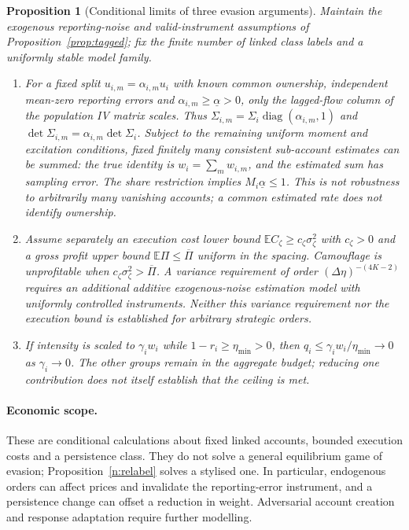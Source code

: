\documentclass[12pt]{article}
\newtheorem{proposition}[theorem]{Proposition}
\theoremstyle{definition}
\theoremstyle{remark}
\begin{document}
\begin{proposition}[Conditional limits of three evasion arguments]\label{prop:strategic}
Maintain the exogenous reporting-noise and valid-instrument assumptions of Proposition~\ref{prop:tagged}; fix the finite number of linked class labels and a uniformly stable model family.
\begin{enumerate}[label=(\roman*)]
\item For a fixed split $u_{i,m}=\alpha_{i,m}u_i$ with known common ownership, independent mean-zero reporting errors and $\alpha_{i,m}\ge\underline\alpha>0$, only the lagged-flow column of the population IV matrix scales. Thus $\Sigma_{i,m}=\Sigma_i\operatorname{diag}(\alpha_{i,m},1)$ and $\det\Sigma_{i,m}=\alpha_{i,m}\det\Sigma_i$. Subject to the remaining uniform moment and excitation conditions, fixed finitely many consistent sub-account estimates can be summed: the true identity is $w_i=\sum_m w_{i,m}$, and the estimated sum has sampling error. The share restriction implies $M_i\underline\alpha\le1$. This is not robustness to arbitrarily many vanishing accounts; a common estimated rate does not identify ownership.
\item Assume separately an execution cost lower bound $\mathbb E C_\zeta\ge c_\zeta\sigma_\zeta^2$ with $c_\zeta>0$ and a gross profit upper bound $\mathbb E\Pi\le\overline\Pi$ uniform in the spacing. Camouflage is unprofitable when $c_\zeta\sigma_\zeta^2>\overline\Pi$. A variance requirement of order $(\Delta\eta)^{-(4K-2)}$ requires an additional additive exogenous-noise estimation model with uniformly controlled instruments. Neither this variance requirement nor the execution bound is established for arbitrary strategic orders.
\item If intensity is scaled to $\gamma_iw_i$ while $1-r_i\ge\eta_{\min}>0$, then $q_i\le\gamma_iw_i/\eta_{\min}\to0$ as $\gamma_i\to0$. The other groups remain in the aggregate budget; reducing one contribution does not itself establish that the ceiling is met.
\end{enumerate}
\end{proposition}

\paragraph{Economic scope.} These are conditional calculations about fixed linked accounts, bounded execution costs and a persistence class. They do not solve a general equilibrium game of evasion; Proposition~\ref{n:relabel} solves a stylised one. In particular, endogenous orders can affect prices and invalidate the reporting-error instrument, and a persistence change can offset a reduction in weight. Adversarial account creation and response adaptation require further modelling.
\end{document}
